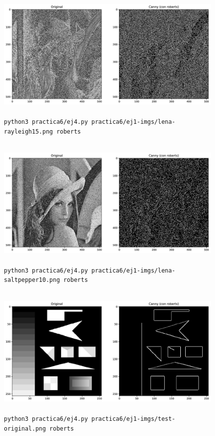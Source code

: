 \documentclass[11pt, spanish]{article}
\begin{document}
\begin{figure}[H]
\centering
    \includegraphics[height=6.5cm]{informe-imgs/ej4-roberts-lena-rayleigh15.jpg}
    \caption{\texttt{python3 practica6/ej4.py practica6/ej1-imgs/lena-rayleigh15.png roberts}}
\end{figure}

\begin{figure}[H]
\centering
    \includegraphics[height=6.5cm]{informe-imgs/ej4-roberts-lena-saltpepper10.jpg}
    \caption{\texttt{python3 practica6/ej4.py practica6/ej1-imgs/lena-saltpepper10.png roberts}}
\end{figure}


\begin{figure}[H]
\centering
    \includegraphics[height=6.5cm]{informe-imgs/ej4-roberts-test-original.jpg}
    \caption{\texttt{python3 practica6/ej4.py practica6/ej1-imgs/test-original.png roberts}}
\end{figure}
\end{document}
